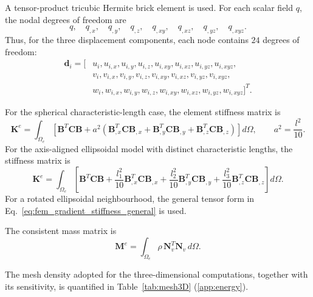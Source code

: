 \documentclass[final,3p,times,fleqn]{elsarticle}
\newcommand{\revtwo}[1]{\textcolor{revtwocolor}{#1}}
\begin{document}
A tensor-product tricubic Hermite brick element is used. For each scalar
field $q$, the nodal degrees of freedom are
\begin{equation}
\label{eq:3d_scalar_hermite_dofs}
q,
\quad
q_{,x},
\quad
q_{,y},
\quad
q_{,z},
\quad
q_{,xy},
\quad
q_{,xz},
\quad
q_{,yz},
\quad
q_{,xyz}.
\end{equation}
Thus, for the three displacement components, each node contains
$24$ degrees of freedom:
\begin{equation}
\label{eq:3d_hermite_dofs_fem}
\begin{aligned}
\mathbf{d}_i=[&
u_i,u_{i,x},u_{i,y},u_{i,z},u_{i,xy},u_{i,xz},u_{i,yz},u_{i,xyz},\\
&
v_i,v_{i,x},v_{i,y},v_{i,z},v_{i,xy},v_{i,xz},v_{i,yz},v_{i,xyz},\\
&
w_i,w_{i,x},w_{i,y},w_{i,z},w_{i,xy},w_{i,xz},w_{i,yz},w_{i,xyz}
]^T .
\end{aligned}
\end{equation}

For the spherical characteristic-length case, the element stiffness matrix is
\begin{equation}
\label{eq:3d_hermite_stiffness_isotropic}
\mathbf{K}^{e}
=
\int_{\Omega_e}
\left[
\mathbf{B}^{T}\mathbf{C}\mathbf{B}
+
a^2
\left(
\mathbf{B}_{,x}^{T}\mathbf{C}\mathbf{B}_{,x}
+
\mathbf{B}_{,y}^{T}\mathbf{C}\mathbf{B}_{,y}
+
\mathbf{B}_{,z}^{T}\mathbf{C}\mathbf{B}_{,z}
\right)
\right]d\Omega,
\qquad
a^2=\frac{l^2}{10}.
\end{equation}
For the axis-aligned ellipsoidal model with distinct characteristic
lengths, the stiffness matrix is
\begin{equation}
\label{eq:3d_hermite_stiffness_anisotropic}
\mathbf{K}^{e}
=
\int_{\Omega_e}
\left[
\mathbf{B}^{T}\mathbf{C}\mathbf{B}
+
\frac{l_1^2}{10}
\mathbf{B}_{,x}^{T}\mathbf{C}\mathbf{B}_{,x}
+
\frac{l_2^2}{10}
\mathbf{B}_{,y}^{T}\mathbf{C}\mathbf{B}_{,y}
+
\frac{l_3^2}{10}
\mathbf{B}_{,z}^{T}\mathbf{C}\mathbf{B}_{,z}
\right]d\Omega .
\end{equation}
For a rotated ellipsoidal neighbourhood, the general tensor form in
Eq.~\eqref{eq:fem_gradient_stiffness_general} is used.

The consistent mass matrix is
\begin{equation}
\label{eq:3d_hermite_mass}
\mathbf{M}^{e}
=
\int_{\Omega_e}
\rho\,\mathbf{N}_v^T\mathbf{N}_v\,d\Omega .
\end{equation}

\revtwo{The mesh density adopted for the three-dimensional computations,
together with its sensitivity, is quantified in
Table~\ref{tab:mesh3D} (\ref{app:energy}).}
\end{document}
